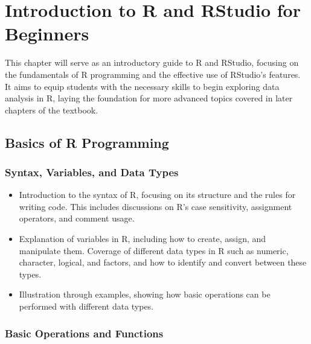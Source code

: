 \documentclass[
]{book}
\begin{document}
\hypertarget{introduction-to-r-and-rstudio-for-beginners}{%
\chapter*{Introduction to R and RStudio for Beginners}\label{introduction-to-r-and-rstudio-for-beginners}}

This chapter will serve as an introductory guide to R and RStudio, focusing on the fundamentals of R programming and the effective use of RStudio's features. It aims to equip students with the necessary skills to begin exploring data analysis in R, laying the foundation for more advanced topics covered in later chapters of the textbook.

\hypertarget{basics-of-r-programming}{%
\section*{Basics of R Programming}\label{basics-of-r-programming}}

\hypertarget{syntax-variables-and-data-types}{%
\subsection*{Syntax, Variables, and Data Types}\label{syntax-variables-and-data-types}}

\begin{itemize}
\item
  Introduction to the syntax of R, focusing on its structure and the rules for writing code. This includes discussions on R's case sensitivity, assignment operators, and comment usage.
\item
  Explanation of variables in R, including how to create, assign, and manipulate them. Coverage of different data types in R such as numeric, character, logical, and factors, and how to identify and convert between these types.
\item
  Illustration through examples, showing how basic operations can be performed with different data types.
\end{itemize}

\hypertarget{basic-operations-and-functions}{%
\subsection*{Basic Operations and Functions}\label{basic-operations-and-functions}}
\end{document}
